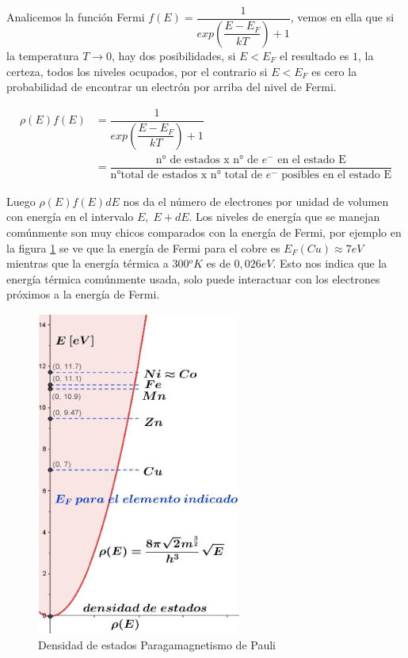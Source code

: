 Analicemos la función Fermi $f(E)=\dfrac{1}{exp \left(\dfrac{E-E_{F}}{kT}\right)+1 }$, vemos en ella que si la temperatura $T\rightarrow 0$, hay dos posibilidades, si $E < E_{F}$ el resultado es $1$, la certeza, todos los niveles ocupados, por el contrario si $E<E_{F}$ es cero la probabilidad de encontrar un electrón por arriba del nivel de Fermi.

\begin{equation}
\begin{aligned}
	\rho(E)f(E) &= \dfrac{1}{exp\left(\dfrac{E-E_{F}}{kT}\right)+1 } \\
	&= \dfrac{\text{n° de estados x n° de $e^{-}$ en el estado E}}{\text{n°total de estados x  n° total de $e^{-}$ posibles en el estado E}}	
\end{aligned}
\end{equation}


Luego $\rho(E)f(E)dE$ nos da el número de electrones por unidad de volumen con energía en el intervalo $E , \; E+dE$. Los niveles de energía que se manejan comúnmente son muy chicos comparados con la energía de Fermi, por ejemplo en la figura \ref{fig:s15} se ve que la energía de Fermi para el cobre es $E_{F}(Cu)\approx 7eV$ mientras que la energía térmica a $300{^{o}}K$ es de $0,026eV$. Esto nos indica que la energía térmica comúnmente usada, solo puede interactuar con los electrones próximos a la energía de Fermi.

\begin{figure}[H]
    \centering
    \includegraphics[width=0.6\textwidth]{./Figures/fig_s15}
	\caption{Densidad de estados Paragamagnetismo de Pauli}
	\label{fig:s15}
\end{figure}

